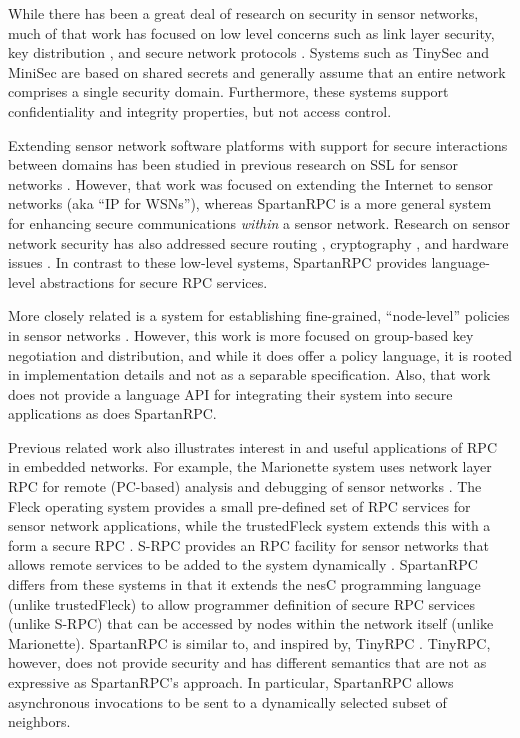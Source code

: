 While there has been a great deal of research on security in sensor networks, much of that work
has focused on low level concerns such as link layer security, key distribution
\cite{camtepe-bulent-05}, and secure network protocols \cite{1049776,fouladgar-3tls-2006}.
Systems such as TinySec \cite{karlog-tinysec-2004} and MiniSec \cite{luk-minisec-2007} are based
on shared secrets and generally assume that an entire network comprises a single security
domain. Furthermore, these systems support confidentiality and integrity properties, but not
access control.

Extending sensor network software platforms with support for secure interactions between domains
has been studied in previous research on SSL for sensor networks \cite{10.1109/WAINA.2009.47}.
However, that work was focused on extending the Internet to sensor networks (aka ``IP for
WSNs''), whereas SpartanRPC is a more general system for enhancing secure communications
\emph{within} a sensor network. Research on sensor network security has also addressed secure
routing \cite{senroute-ahnj03}, cryptography \cite{bertoni-2006}, and hardware issues
\cite{perrig-2004}. In contrast to these low-level systems, SpartanRPC provides language-level
abstractions for secure RPC services.

More closely related is a system for establishing fine-grained, ``node-level'' policies in
sensor networks \cite{Claycomb:2011:NNL:1889383.1889450}. However, this work is more focused on
group-based key negotiation and distribution, and while it does offer a policy language, it is
rooted in implementation details and not as a separable specification. Also, that work does not
provide a language API for integrating their system into secure applications as does SpartanRPC.

Previous related work also illustrates interest in and useful applications of RPC in embedded
networks. For example, the Marionette system uses network layer RPC for remote (PC-based)
analysis and debugging of sensor networks \cite{whitehouse-marionette-2006}. The Fleck operating
system provides a small pre-defined set of RPC services for sensor network applications, while
the trustedFleck system extends this with a form a secure RPC
\cite{hu-secfleck-2009,Hu:2010:TTW:1806895.1806900}. S-RPC provides an RPC facility for sensor
networks that allows remote services to be added to the system dynamically \cite{5766863}.
SpartanRPC differs from these systems in that it extends the nesC programming language (unlike
trustedFleck) to allow programmer definition of secure RPC services (unlike S-RPC) that can be
accessed by nodes within the network itself (unlike Marionette). SpartanRPC is similar to, and
inspired by, TinyRPC \cite{may-tinyrpc-2007}. TinyRPC, however, does not provide security and
has different semantics that are not as expressive as SpartanRPC's approach. In particular,
SpartanRPC allows asynchronous invocations to be sent to a dynamically selected subset of
neighbors.

